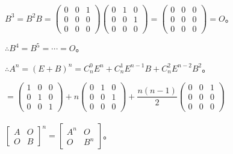 $B^3=B^2B=\left(\begin{array}{ccc}
    0 & 0 & 1 \\
    0 & 0 & 0 \\
    0 & 0 & 0
\end{array}\right)\left(\begin{array}{ccc}
    0 & 1 & 0 \\
    0 & 0 & 1 \\
    0 & 0 & 0
\end{array}\right)=\left(\begin{array}{ccc}
    0 & 0 & 0 \\
    0 & 0 & 0 \\
    0 & 0 & 0
\end{array}\right)=O$。

$\therefore B^4=B^5=\cdots=O$。

$\therefore A^n=(E+B)^n=C_n^0E^n+C_n^1E^{n-1}B+C_n^2E^{n-2}B^2$。\medskip

$=\left(\begin{array}{ccc}
    1 & 0 & 0 \\
    0 & 1 & 0 \\
    0 & 0 & 1
\end{array}\right)+n\left(\begin{array}{ccc}
    0 & 1 & 0 \\
    0 & 0 & 1 \\
    0 & 0 & 0
\end{array}\right)+\dfrac{n(n-1)}{2}\left(\begin{array}{ccc}
    0 & 0 & 1 \\
    0 & 0 & 0 \\
    0 & 0 & 0
\end{array}\right)$

\paragraph{}

$\left[\begin{array}{cc}
    A & O \\
    O & B
\end{array}\right]^n=\left[\begin{array}{cc}
    A^n & O \\
    O & B^n
\end{array}\right]$。

\paragraph{}

